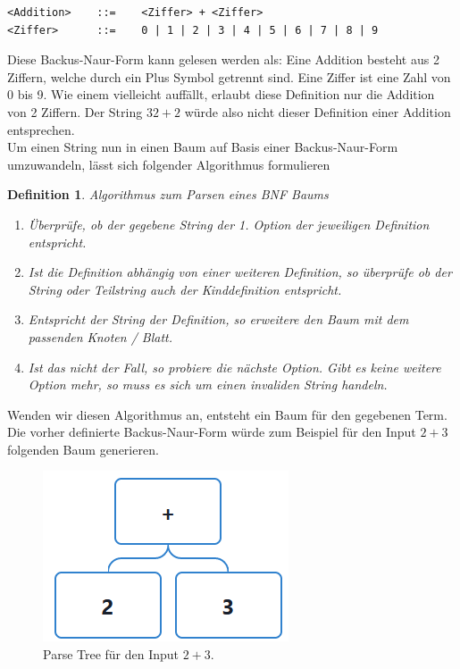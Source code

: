 \documentclass[11pt]{article}
\newtheorem{defin}{Definition}
\begin{document}
\begin{verbatim}
<Addition>    ::=    <Ziffer> + <Ziffer>
<Ziffer>      ::=    0 | 1 | 2 | 3 | 4 | 5 | 6 | 7 | 8 | 9 
\end{verbatim}
Diese Backus-Naur-Form kann gelesen werden als: 
Eine Addition besteht aus 2 Ziffern, 
welche durch ein Plus Symbol getrennt sind. 
Eine Ziffer ist eine Zahl von 0 bis 9. 
Wie einem vielleicht auffällt, erlaubt diese Definition nur 
die Addition von 2 Ziffern. Der String $32+2$ würde also nicht 
dieser Definition einer Addition entsprechen. \newline \\
Um einen String nun in einen Baum auf Basis einer Backus-Naur-Form umzuwandeln, 
lässt sich folgender Algorithmus formulieren

\begin{defin}
  Algorithmus zum Parsen eines BNF Baums
  \begin{enumerate}
    \item Überprüfe, ob der gegebene String der 1. Option der jeweiligen Definition entspricht.
    \item Ist die Definition abhängig von einer weiteren Definition, so überprüfe ob der String oder Teilstring auch der Kinddefinition entspricht.
    \item Entspricht der String der Definition, so erweitere den Baum mit dem passenden Knoten / Blatt.
    \item Ist das nicht der Fall, so probiere die nächste Option. Gibt es keine weitere Option mehr, so muss es sich um einen invaliden String handeln.
  \end{enumerate}
\end{defin}

Wenden wir diesen Algorithmus an, 
entsteht ein Baum für den gegebenen Term.
Die vorher definierte Backus-Naur-Form würde 
zum Beispiel für den Input $2+3$ folgenden Baum generieren.

\begin{figure}[h]
  \centering
  \includegraphics[scale=0.5]{trees/beispiel_bnf_1.png}
  \caption{Parse Tree für den Input $2+3$.}
\end{figure}
\end{document}
